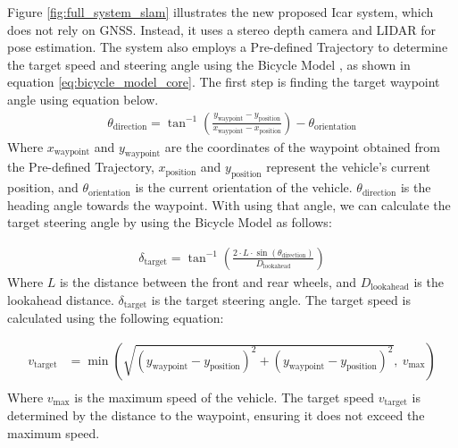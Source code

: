 Figure \ref{fig:full_system_slam} illustrates the new proposed Icar system, which does not rely on GNSS. Instead, it uses a stereo depth camera and LIDAR for pose estimation. The system also employs a Pre-defined Trajectory to determine the target speed and steering angle using the Bicycle Model \cite{rajamani2011vehicle}, as shown in equation \ref{eq:bicycle_model_core}. The first step is finding the target waypoint angle using equation below.
\begin{equation}
	\begin{aligned}
	\theta_{\text{direction}} = \tan^{-1}\left(\frac{y_{\text{waypoint}} - y_{\text{position}}}{x_{\text{waypoint}} - x_{\text{position}}}\right) - \theta_{\text{orientation}}
	\label{eq:waypoint_angle}
	\end{aligned}
\end{equation}
Where $x_{\text{waypoint}}$ and $y_{\text{waypoint}}$ are the coordinates of the waypoint obtained from the Pre-defined Trajectory, $x_{\text{position}}$ and $y_{\text{position}}$ represent the vehicle's current position, and $\theta_{\text{orientation}}$ is the current orientation of the vehicle. $\theta_{\text{direction}}$ is the heading angle towards the waypoint. With using that angle, we can calculate the target steering angle by using the Bicycle Model as follows:

\begin{equation}
	\begin{aligned}
	\delta_{\text{target}} = \tan^{-1}\left( \frac{2 \cdot L \cdot \sin(\theta_{\text{direction}})}{D_{\text{lookahead}}} \right)
	\label{eq:bicycle_model_full}
	\end{aligned}
\end{equation}
Where $L$ is the distance between the front and rear wheels, and $D_{\text{lookahead}}$ is the lookahead distance. $\delta_{\text{target}}$ is the target steering angle. The target speed is calculated using the following equation:

\begin{equation}
	\begin{aligned}
		v_{\text{target}} &= \min\left(\sqrt{(y_{\text{waypoint}} - y_{\text{position}})^2 + (y_{\text{waypoint}} - y_{\text{position}})^2}, \ v_{\text{max}}\right) \\
		\label{eq:bicycle_model_velocity}
	\end{aligned}		
\end{equation}
Where $v_{\text{max}}$ is the maximum speed of the vehicle. The target speed $v_{\text{target}}$ is determined by the distance to the waypoint, ensuring it does not exceed the maximum speed.

